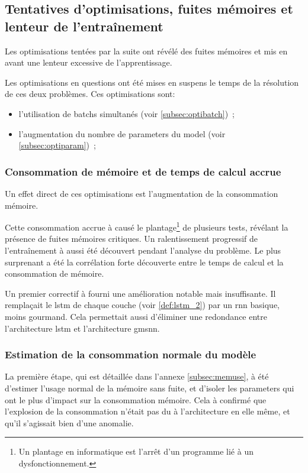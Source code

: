 \subsection{Tentatives d'optimisations, fuites mémoires et lenteur de l'entraînement}\label{subsec:optimem}

Les optimisations tentées par la suite ont révélé des fuites mémoires et mis en avant une lenteur excessive de l'apprentissage.

Les optimisations en questions ont été mises en suspens le temps de la résolution de ces deux problèmes.
Ces optimisations sont:
\begin{itemize}
	\item l'utilisation de \glspl{batch} simultanés (voir \autoref{subsec:optibatch})~; 
	\item l'augmentation du nombre de \glspl{parameter} du \gls{model} (voir \autoref{subsec:optiparam})~;
\end{itemize}

\subsubsection{Consommation de mémoire et de temps de calcul accrue}
Un effet direct de ces optimisations est l'augmentation de la consommation mémoire.

Cette consommation accrue à causé le plantage\footnote{Un plantage en informatique est l'arrêt d'un programme lié à un dysfonctionnement.} de plusieurs tests, révélant la présence de fuites mémoires critiques.
Un ralentissement progressif de l'entraînement à aussi été découvert pendant l'analyse du problème.
Le plus surprenant a été la corrélation forte découverte entre le temps de calcul et la consommation de mémoire.

Un premier correctif à fourni une amélioration notable mais insuffisante.
Il remplaçait le \gls{lstm} de chaque couche (voir \autoref{def:lstm_2}) par un \gls{rnn} basique, moins gourmand. Cela permettait aussi d'éliminer une redondance entre l'architecture \gls{lstm} et l'architecture \gls{gmsnn}.

\subsubsection{Estimation de la consommation normale du modèle}
La première étape, qui est détaillée dans l'annexe \ref{subsec:memuse}, à été d'estimer l'usage normal de la mémoire sans fuite, et d'isoler les \glspl{parameter} qui ont le plus d'impact sur la consommation mémoire.
Cela à confirmé que l'explosion de la consommation n'était pas du à l'architecture en elle même, et qu'il s'agissait bien d'une anomalie.

